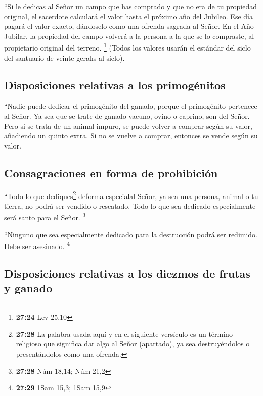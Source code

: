 ``Si le dedicas al Señor un campo que has comprado y que
no era de tu propiedad original,  el sacerdote calculará
el valor hasta el próximo año del Jubileo. Ese día pagará el valor
exacto, dándoselo como una ofrenda sagrada al Señor.  En
el Año Jubilar, la propiedad del campo volverá a la persona a la que se
lo compraste, al propietario original del terreno. \footnote{\textbf{27:24}
  Lev 25,10}  (Todos los valores usarán el estándar del
siclo del santuario de veinte gerahs al siclo).

\hypertarget{disposiciones-relativas-a-los-primoguxe9nitos}{%
\subsection{Disposiciones relativas a los
primogénitos}\label{disposiciones-relativas-a-los-primoguxe9nitos}}

 ``Nadie puede dedicar el primogénito del ganado, porque
el primogénito pertenece al Señor. Ya sea que se trate de ganado vacuno,
ovino o caprino, son del Señor.  Pero si se trata de un
animal impuro, se puede volver a comprar según su valor, añadiendo un
quinto extra. Si no se vuelve a comprar, entonces se vende según su
valor.

\hypertarget{consagraciones-en-forma-de-prohibiciuxf3n}{%
\subsection{Consagraciones en forma de
prohibición}\label{consagraciones-en-forma-de-prohibiciuxf3n}}

 ``Todo lo que dediques\footnote{\textbf{27:28} La
  palabra usada aquí y en el siguiente versículo es un término religioso
  que significa dar algo al Señor (apartado), ya sea destruyéndolos o
  presentándolos como una ofrenda.} deforma especialal Señor, ya sea una
persona, animal o tu tierra, no podrá ser vendido o rescatado. Todo lo
que sea dedicado especialmente será santo para el Señor. \footnote{\textbf{27:28}
  Núm 18,14; Núm 21,2}

 ``Ninguno que sea especialmente dedicado para la
destrucción podrá ser redimido. Debe ser asesinado. \footnote{\textbf{27:29}
  1Sam 15,3; 1Sam 15,9}

\hypertarget{disposiciones-relativas-a-los-diezmos-de-frutas-y-ganado}{%
\subsection{Disposiciones relativas a los diezmos de frutas y
ganado}\label{disposiciones-relativas-a-los-diezmos-de-frutas-y-ganado}}

